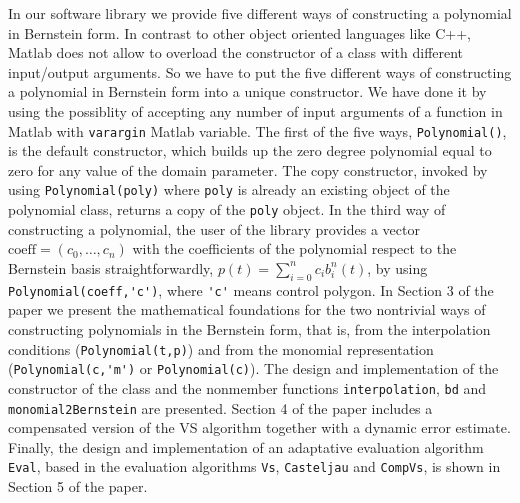 \documentclass[a4paper,10pt]{report}
\begin{document}
In our software library we provide five different ways of constructing a polynomial in Bernstein form.
In contrast to other object oriented languages like C++, Matlab does not allow to overload the constructor
of a class with different input/output arguments. So we have to put the five different ways of constructing a polynomial in Bernstein form
into a unique constructor. We have done it by using the possiblity of accepting any number of input arguments of a function 
in Matlab with \verb"varargin" Matlab variable. The first of the five ways, \verb"Polynomial()", is the default constructor, 
which builds up the zero degree polynomial equal to zero for any 
value of the domain parameter. The copy constructor, invoked by using
\verb"Polynomial(poly)" where \verb"poly" is already an existing object of the polynomial class, returns a copy
of the \verb"poly" object.
In the third way of constructing a polynomial, the user of the library provides a vector $\text{coeff}=(c_0,\ldots,c_n)$ 
with the coefficients of the polynomial respect 
to the Bernstein basis straightforwardly, $p(t)=\sum_{i=0}^n c_ib_i^n(t)$, by using \verb"Polynomial(coeff,'c')", where
\verb"'c'" means control polygon. In Section 3 of the paper we present the mathematical foundations for the two nontrivial ways of constructing polynomials in the Bernstein form, that is, 
from the interpolation conditions (\verb"Polynomial(t,p)") and from the monomial representation (\verb"Polynomial(c,'m')" or \verb"Polynomial(c)").
The design and implementation of the constructor
of the class and the nonmember functions \verb"interpolation", \verb"bd" and \verb"monomial2Bernstein" are presented.
Section 4 of the paper includes a compensated version of the VS algorithm together with a dynamic error estimate. Finally, the design and implementation 
of an adaptative evaluation algorithm \verb"Eval", based in the evaluation algorithms \verb"Vs", \verb"Casteljau" and \verb"CompVs",
is shown in Section 5 of the paper. 
\end{document}
